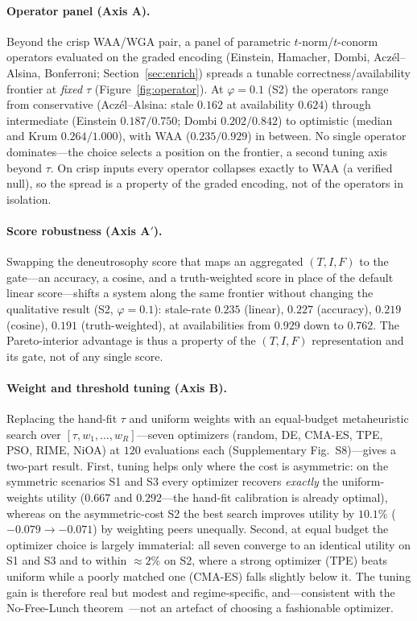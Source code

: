 \documentclass[11pt]{article}
\begin{document}
\paragraph{Operator panel (Axis A).} Beyond the crisp WAA/WGA pair, a panel of parametric
$t$-norm/$t$-conorm operators evaluated on the graded encoding (Einstein, Hamacher, Dombi,
Acz\'el--Alsina, Bonferroni; Section~\ref{sec:enrich}) spreads a tunable correctness/availability
frontier at \emph{fixed} $\tau$ (Figure~\ref{fig:operator}). At $\varphi=0.1$ (S2) the operators range
from conservative (Acz\'el--Alsina: stale $0.162$ at availability $0.624$) through intermediate
(Einstein $0.187/0.750$; Dombi $0.202/0.842$) to optimistic (median and Krum $0.264/1.000$), with WAA
($0.235/0.929$) in between. No single operator dominates---the choice selects a position on the
frontier, a second tuning axis beyond $\tau$. On crisp inputs every operator collapses exactly to WAA (a
verified null), so the spread is a property of the graded encoding, not of the operators in isolation.

\paragraph{Score robustness (Axis A$'$).} Swapping the deneutrosophy score that maps an aggregated
$(T,I,F)$ to the gate---an accuracy, a cosine, and a truth-weighted score in place of the default
linear score---shifts a system along the same frontier without changing the qualitative result (S2,
$\varphi=0.1$): stale-rate $0.235$ (linear), $0.227$ (accuracy), $0.219$ (cosine), $0.191$
(truth-weighted), at availabilities from $0.929$ down to $0.762$. The Pareto-interior advantage is thus a
property of the $(T,I,F)$ representation and its gate, not of any single score.

\paragraph{Weight and threshold tuning (Axis B).} Replacing the hand-fit $\tau$ and uniform weights with
an equal-budget metaheuristic search over $[\tau, w_1,\dots,w_R]$---seven optimizers (random, DE, CMA-ES,
TPE, PSO, RIME, NiOA) at $120$ evaluations each (Supplementary Fig.~S8)---gives a two-part
result. First, tuning helps only where the cost is asymmetric: on the symmetric scenarios S1 and
S3 every optimizer recovers \emph{exactly} the uniform-weights utility ($0.667$ and $0.292$---the hand-fit
calibration is already optimal), whereas on the asymmetric-cost S2 the best search improves utility by
$10.1\%$ ($-0.079\to-0.071$) by weighting peers unequally. Second, at equal budget the optimizer choice is
largely immaterial: all seven converge to an identical utility on S1 and S3 and to within ${\approx}2\%$
on S2, where a strong optimizer (TPE) beats uniform while a poorly matched one (CMA-ES) falls
slightly below it. The tuning gain is therefore real but modest and regime-specific, and---consistent with
the No-Free-Lunch theorem~\cite{wolpert1997nfl}---not an artefact of choosing a fashionable optimizer.
\end{document}

